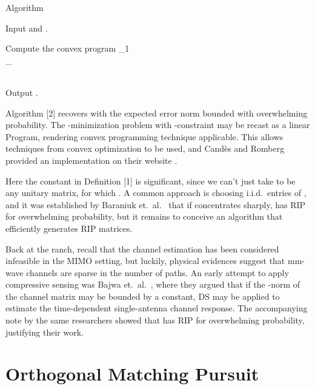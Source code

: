 \Result
{Algorithm}
{
\startitemize[n]
\item Input  and .
%
\item Compute the convex program
%
 {
\leftarrow \startcases
{} \MC {} _1 \\
%
 \;  \quad \MC {} _\infty \leq \g \\
\stopcases \\
}
\item Output .
\stopitemize
}

Algorithm [2] recovers  with the expected error norm bounded with overwhelming probability.
The -minimization problem with \m {\ell_\infty}-constraint may be recast as a linear Program, rendering convex programming technique applicable.
This allows techniques from convex optimization to be used, and Candès and Romberg provided an implementation on their website \cite {CaR05}.

Here the constant  in Definition [1] is significant, since we can't just take  to be any unitary matrix, for which .
A common approach is choosing i.i.d.\ entries of , and it was established by Baraniuk et.\ al.\ \cite {BDD08} that if  concentrates sharply,  has RIP for overwhelming probability, but it remains to conceive an algorithm that efficiently generates RIP matrices.

Back at the ranch, recall that the channel estimation has been considered infeasible in the MIMO setting, but luckily, physical evidences suggest that mm-wave channels are sparse in the number of paths.
An early attempt to apply compressive sensing was Bajwa et.\ al.\ \cite {BHS10}, where they argued that if the -norm of the channel matrix may be bounded by a constant, DS may be applied to estimate the time-dependent single-antenna channel response.
The accompanying note by the same researchers \cite {BHR08} showed that  has RIP for overwhelming probability, justifying their work.



\section {Orthogonal Matching Pursuit}

